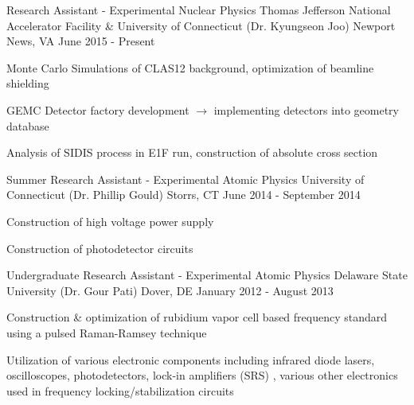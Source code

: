 

\begin{cventries}

  \cventry
    {Research Assistant - Experimental Nuclear Physics} %
    {Thomas Jefferson National Accelerator Facility \& University of Connecticut (Dr. Kyungseon Joo)} %
    {Newport News, VA} %
    {June 2015 - Present} %
    {
      \begin{cvitems} %
        \item {Monte Carlo Simulations of CLAS12 background, optimization of beamline shielding}
        \item {GEMC Detector factory development $\rightarrow$ implementing detectors into geometry database}
        \item {Analysis of SIDIS process in E1F run, construction of absolute cross section}
      \end{cvitems}
    }

  \cventry
    {Summer Research Assistant - Experimental Atomic Physics} %
    {University of Connecticut (Dr. Phillip Gould)} %
    {Storrs, CT} %
    {June 2014 - September 2014} %
    {
      \begin{cvitems} %
        \item {Construction of high voltage power supply}
        \item {Construction of photodetector circuits}
      \end{cvitems}
    }

  \cventry
    {Undergraduate Research Assistant - Experimental Atomic Physics} %
    {Delaware State University (Dr. Gour Pati)} %
    {Dover, DE} %
    {January 2012 - August 2013} %
    {
      \begin{cvitems} %
        \item {Construction \& optimization of rubidium vapor cell based frequency standard using a pulsed Raman-Ramsey technique}
        \item {Utilization of various electronic components including infrared diode lasers, oscilloscopes, photodetectors, lock-in amplifiers (SRS)
        , various other electronics used in frequency locking/stabilization circuits}
      \end{cvitems}
    }


\end{cventries}
